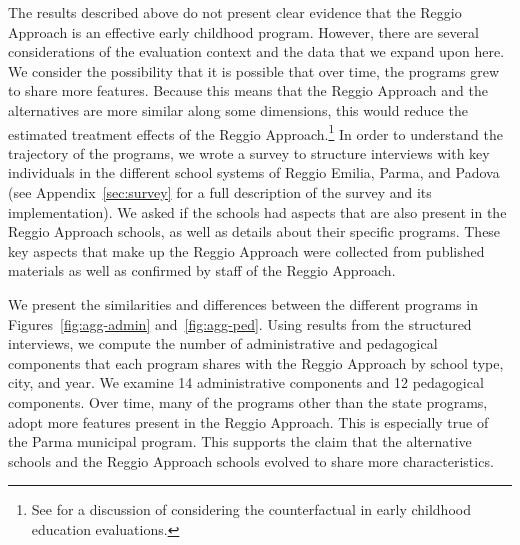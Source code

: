 
The results described above do not present clear evidence that the Reggio Approach is an effective early childhood program. However, there are several considerations of the evaluation context and the data that we expand upon here. We consider the possibility that it is possible that over time, the programs grew to share more features. Because this means that the Reggio Approach and the alternatives are more similar along some dimensions, this would reduce the estimated treatment effects of the Reggio Approach.\footnote{See \citet{Elango_Hojman_etal_2016_Early-Edu} for a discussion of considering the counterfactual in early childhood education evaluations.} In order to understand the trajectory of the programs, we wrote a survey to structure interviews with key individuals in the different school systems of Reggio Emilia, Parma, and Padova (see Appendix~\ref{sec:survey} for a full description of the survey and its implementation). We asked if the schools had aspects that are also present in the Reggio Approach schools, as well as details about their specific programs. These key aspects that make up the Reggio Approach were collected from published materials as well as confirmed by staff of the Reggio Approach. 

We present the similarities and differences between the different programs in Figures~\ref{fig:agg-admin} and~\ref{fig:agg-ped}. Using results from the structured interviews, we compute the number of administrative and pedagogical components that each program shares with the Reggio Approach by school type, city, and year. We examine 14 administrative components and 12 pedagogical components. Over time, many of the programs other than the state programs, adopt more features present in the Reggio Approach. This is especially true of the Parma municipal program. This supports the claim that the alternative schools and the Reggio Approach schools evolved to share more characteristics.

